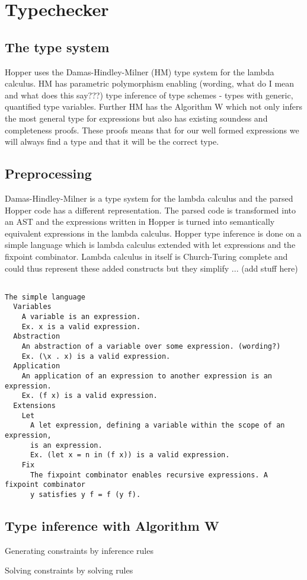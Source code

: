 \section{Typechecker}

\subsection{The type system}

Hopper uses the Damas-Hindley-Milner (HM) type system for the lambda calculus. HM has parametric polymorphism enabling (wording, what do I mean and what does this say???) type inference of type schemes - types with generic, quantified type variables. Further HM has the Algorithm W which not only infers the most general type for expressions but also has existing soundess and completeness proofs. These proofs means that for our well formed expressions we will always find a type and that it will be the correct type.

\subsection{Preprocessing}

Damas-Hindley-Milner is a type system for the lambda calculus and the parsed Hopper code has a different representation. The parsed code is transformed into an AST and the expressions written in Hopper is turned into semantically equivalent expressions in the lambda calculus. Hopper type inference is done on a simple language which is lambda calculus extended with let expressions and the fixpoint combinator. Lambda calculus in itself is Church-Turing complete and could thus represent these added constructs but they simplify ... (add stuff here)
\begin{verbatim}

The simple language
  Variables
    A variable is an expression.
    Ex. x is a valid expression.
  Abstraction
    An abstraction of a variable over some expression. (wording?)
    Ex. (\x . x) is a valid expression.
  Application
    An application of an expression to another expression is an expression.
    Ex. (f x) is a valid expression.
  Extensions
    Let
      A let expression, defining a variable within the scope of an expression,
      is an expression.
      Ex. (let x = n in (f x)) is a valid expression. 
    Fix
      The fixpoint combinator enables recursive expressions. A fixpoint combinator
      y satisfies y f = f (y f).

\end{verbatim}

\subsection{Type inference with Algorithm W}

Generating constraints by inference rules

Solving constraints by solving rules
